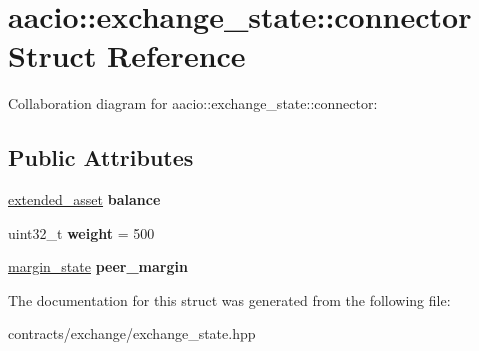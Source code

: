 \hypertarget{structaacio_1_1exchange__state_1_1connector}{}\section{aacio\+:\+:exchange\+\_\+state\+:\+:connector Struct Reference}
\label{structaacio_1_1exchange__state_1_1connector}


Collaboration diagram for aacio\+:\+:exchange\+\_\+state\+:\+:connector\+:
\subsection*{Public Attributes}
\begin{DoxyCompactItemize}
\item 
\mbox{\label{structaacio_1_1exchange__state_1_1connector_ae54ad86d10620893b140b2e33d46ea49}} 
\mbox{\hyperlink{structaacio_1_1extended__asset}{extended\+\_\+asset}} {\bfseries balance}
\item 
\mbox{\label{structaacio_1_1exchange__state_1_1connector_afce7206b3f697627b055e8e1da067a71}} 
uint32\+\_\+t {\bfseries weight} = 500
\item 
\mbox{\label{structaacio_1_1exchange__state_1_1connector_a0678381c9f2739021d8d6bb6c8925953}} 
\mbox{\hyperlink{structaacio_1_1margin__state}{margin\+\_\+state}} {\bfseries peer\+\_\+margin}
\end{DoxyCompactItemize}


The documentation for this struct was generated from the following file\+:\begin{DoxyCompactItemize}
\item 
contracts/exchange/exchange\+\_\+state.\+hpp\end{DoxyCompactItemize}

